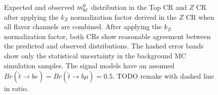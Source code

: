 \begin{figure}
  \centering
  \caption{
    Expected and observed $m_{b\ell}^0$ distribution in the Top CR and
    $Z$ CR after applying the $k_Z$ normalization factor derived in the $Z$ CR
    when all flavor channels are combined.
    After applying the $k_Z$ normalization factor, both CRs show reasonable
    agreement between the predicted and observed distributions.
    The hashed error bands show only the statistical uncertainty in the
    background MC simulation samples.
    The signal models have an assumed
    $Br(\tilde{t}\rightarrow be) = Br(\tilde{t}\rightarrow b\mu) = 0.5$.
    {\color{red} TODO remake with dashed line in ratio.}
  }
  \label{fig:cr_mbl_0__w_norm_factor}
\end{figure}

